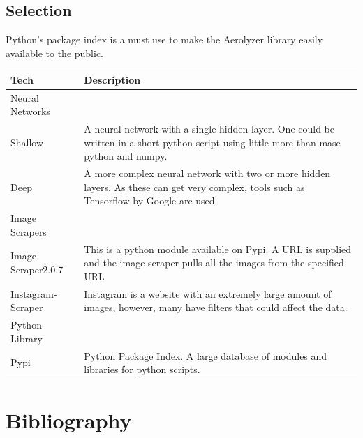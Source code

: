 \documentclass[onecolumn, draftclsnofoot,10pt, compsoc]{IEEEtran}
\begin{document}
\begin{singlespace}
\subsection{Selection}
Python's package index is a must use to make the Aerolyzer library easily available to the public. 

\begin{table}[h!]
\centering
 \begin{tabular}{||p{6cm}  p{11cm}||} 
 \hline
 Tech & Description\\ [0.5ex] 
 \hline\hline
 Neural Networks&\\
 \hline
 Shallow & A neural network with a single hidden layer. One could be written in a short python script using little more than mase python and numpy.\\
 
 Deep & A more complex neural network with two or more hidden layers. As these can get very complex, tools such as Tensorflow by Google are used\\
 \hline
 Image Scrapers&\\
 \hline
 Image-Scraper2.0.7 & This is a python module available on Pypi. A URL is supplied and the image scraper pulls all the images from the specified URL \\
 Instagram-Scraper & Instagram is a website with an extremely large amount of images, however, many have filters that could affect the data. \\
 \hline
 Python Library&\\
 \hline
 Pypi & Python Package Index. A large database of modules and libraries for python scripts.  \\ [1ex] 
 \hline
 \end{tabular}
\end{table}

\section{Bibliography}



\end{singlespace}
\end{document}
